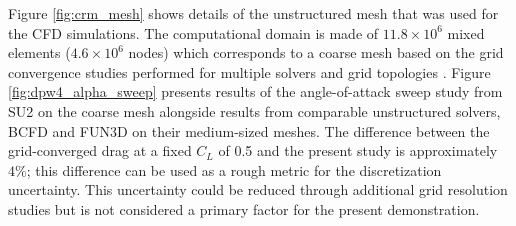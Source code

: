Figure \ref{fig:crm_mesh} shows details of the unstructured mesh that was used for the CFD simulations. The computational domain is made of $11.8\times10^6$ mixed elements ($4.6\times10^6$ nodes) which corresponds to a coarse mesh based on the grid convergence studies performed for multiple solvers and grid topologies \cite{vassberg_summary_2010}. Figure \ref{fig:dpw4_alpha_sweep} presents results of the angle-of-attack sweep study from SU2 on the coarse mesh alongside results from comparable unstructured solvers, BCFD \cite{winkler_dorgan_cary_mani_2009} and FUN3D \cite{lee-rausch_application_2014} on their medium-sized meshes. 
The difference between the grid-converged drag at a fixed $C_L$ of 0.5 and the present study is approximately $4\%$; this difference can be used as a rough metric for the discretization uncertainty. This uncertainty could be reduced through additional grid resolution studies but is not considered a primary factor for the present demonstration.

